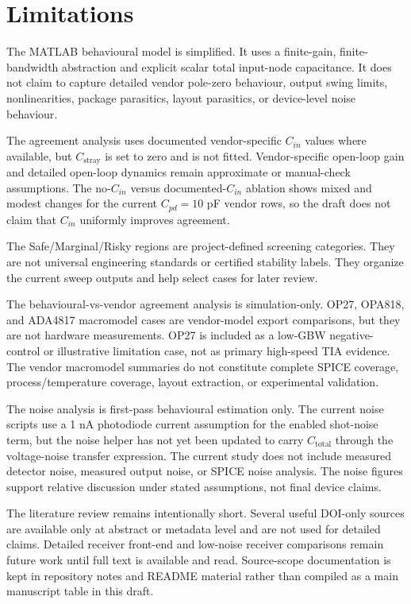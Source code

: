 \section{Limitations}

The MATLAB behavioural model is simplified. It uses a finite-gain, finite-bandwidth abstraction and explicit scalar total input-node capacitance. It does not claim to capture detailed vendor pole-zero behaviour, output swing limits, nonlinearities, package parasitics, layout parasitics, or device-level noise behaviour.

The agreement analysis uses documented vendor-specific $C_{in}$ values where available, but $C_{\mathrm{stray}}$ is set to zero and is not fitted. Vendor-specific open-loop gain and detailed open-loop dynamics remain approximate or manual-check assumptions. The no-$C_{in}$ versus documented-$C_{in}$ ablation shows mixed and modest changes for the current $C_{pd}=10$ pF vendor rows, so the draft does not claim that $C_{in}$ uniformly improves agreement.

The Safe/Marginal/Risky regions are project-defined screening categories. They are not universal engineering standards or certified stability labels. They organize the current sweep outputs and help select cases for later review.

The behavioural-vs-vendor agreement analysis is simulation-only. OP27, OPA818, and ADA4817 macromodel cases are vendor-model export comparisons, but they are not hardware measurements. OP27 is included as a low-GBW negative-control or illustrative limitation case, not as primary high-speed TIA evidence. The vendor macromodel summaries do not constitute complete SPICE coverage, process/temperature coverage, layout extraction, or experimental validation.

The noise analysis is first-pass behavioural estimation only. The current noise scripts use a 1 nA photodiode current assumption for the enabled shot-noise term, but the noise helper has not yet been updated to carry $C_{\mathrm{total}}$ through the voltage-noise transfer expression. The current study does not include measured detector noise, measured output noise, or SPICE noise analysis. The noise figures support relative discussion under stated assumptions, not final device claims.

The literature review remains intentionally short. Several useful DOI-only sources are available only at abstract or metadata level and are not used for detailed claims. Detailed receiver front-end and low-noise receiver comparisons remain future work until full text is available and read. Source-scope documentation is kept in repository notes and README material rather than compiled as a main manuscript table in this draft.

